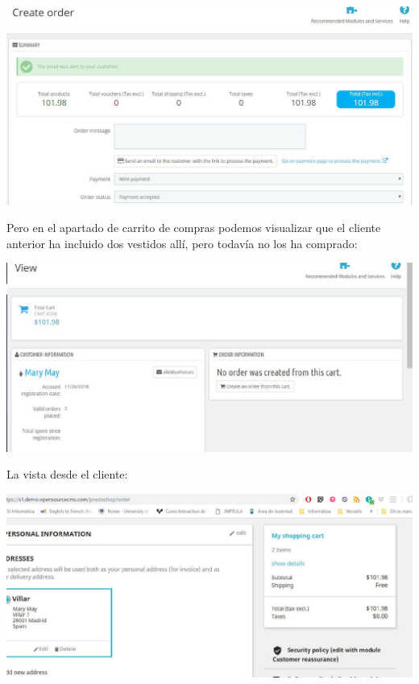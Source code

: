 \documentclass{article}
\begin{document}
\begin{center}
\includegraphics[scale=0.4]{images/order3.jpg}
\end{center}

Pero en el apartado de carrito de compras podemos visualizar que el cliente anterior ha incluido dos vestidos allí, pero todavía no los ha comprado:

\begin{center}
\includegraphics[scale=0.4]{images/order4.jpg}
\end{center}

La vista desde el cliente:

\begin{center}
\includegraphics[scale=0.4]{images/order5.jpg}
\end{center}
\end{document}
